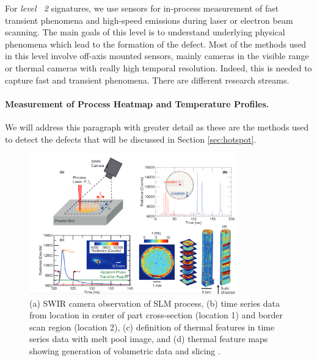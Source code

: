 For \emph{level ~2} signatures, we use sensors for in-process measurement of fast transient phenomena and high-speed emissions during laser or electron beam scanning. The main goals of this level is to understand underlying physical phenomena which lead to the formation of the defect. Most of the methods used in this level involve off-axis mounted sensors, mainly cameras in the visible range or thermal cameras with really high temporal resolution. Indeed, this is needed to capture fast and transient phenomena. There are different research streams.
\paragraph{Measurement of Process Heatmap and Temperature Profiles.} We will address this paragraph with greater detail as these are the methods used to detect the defects that will be discussed in Section \ref{sec:hotspot}.
\begin{figure}
    \centering
    \includegraphics[width=0.8\textwidth]{Images/voxel.png}
    \caption[Example of voxel thermic reconstruction.]{(a) SWIR camera observation of SLM process, (b) time series data from location in center of part cross-section (location 1) and border scan region (location 2), (c) definition of thermal features in time series data with melt pool image, and (d) thermal feature maps showing generation of volumetric data and slicing \cite{lough_-situ_2019}.}
    \label{fig:voxel}
\end{figure}

